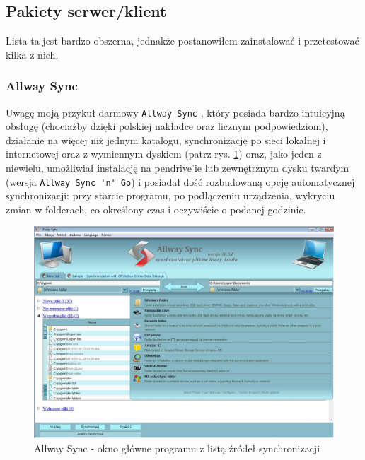 \subsection{Pakiety serwer/klient}
Lista ta jest bardzo obszerna, jednakże postanowiłem zainstalować i przetestować kilka z nich.

\subsubsection{Allway Sync}
Uwagę moją przykuł darmowy \verb|Allway Sync| \cite{1}, który posiada bardzo intuicyjną obsługę (chociażby dzięki polskiej nakładce oraz licznym podpowiedziom), działanie na więcej niż jednym katalogu, synchronizację po sieci lokalnej i internetowej oraz z wymiennym dyskiem (patrz rys. \ref{allway}) oraz, jako jeden z niewielu, umożliwiał instalację na pendrive{}'ie lub zewnętrznym dysku twardym (wersja \verb|Allway Sync 'n' Go|) i posiadał dość rozbudowaną opcję automatycznej synchronizacji: przy starcie programu, po podłączeniu urządzenia, wykryciu zmian w folderach, co określony czas i oczywiście o podanej godzinie.
\begin{figure}[h!]
	\centering
	\includegraphics[width=1\textwidth]{img/s3.jpeg}
	\caption{Allway Sync - okno główne programu z listą źródeł synchronizacji}
	\label{allway}
\end{figure}

